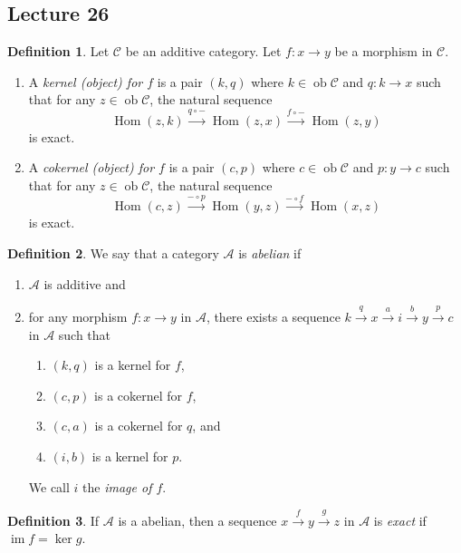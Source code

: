 \documentclass[10pt,letterpaper,cm]{nupset}
\theoremstyle{definition}
\newtheorem{definition}{Definition}[subsection]
\theoremstyle{theorem}
\theoremstyle{remark}
\newcommand{\1}{\mathbf{1}}
\renewcommand{\a}{\mathscr{A}}
\renewcommand{\c}{\mathscr{C}}
\newcommand{\0}{\vec 0}
\DeclareMathOperator{\im}{im}
\DeclareMathOperator{\ob}{ob}
\DeclareMathOperator{\Hom}{Hom}
\begin{document}
\subsection{Lecture 26}

\begin{definition}
Let $\c$ be an additive category. Let $f: x \to y$ be a morphism in $\c$. 
\begin{enumerate}
\item A \textit{kernel (object) for $f$} is a pair $\left(k, q\right)$ where $k \in \ob{\c}$ and $q : k \to x$ such that for any $z \in \ob{\c}$, the natural sequence $$ \Hom(z,k) \overset{q\circ {-}}{\longrightarrow} \Hom(z,x) \overset{f\circ {-}}{\longrightarrow} \Hom(z,y)   $$ is exact.
\item  A \textit{cokernel (object) for $f$} is a pair $\left(c, p\right)$ where $c \in \ob{\c}$ and $p : y \to c$ such that for any $z \in \ob{\c}$, the natural sequence $$ \Hom(c,z) \overset{{-}\circ p}{\longrightarrow} \Hom(y,z) \overset{{-}\circ f}{\longrightarrow} \Hom(x,z)   $$ is exact.
\end{enumerate}
\end{definition}

\begin{definition}
We say that a category $\a$ is \textit{abelian} if
\begin{enumerate}
\item $\a$ is additive and
\item for any morphism $f : x \to y$ in $\a$, there exists a sequence $k \overset{q}{\longrightarrow} x  \overset{a}{\longrightarrow} i \overset{b}{\longrightarrow}y \overset{p}{\longrightarrow} c$ in $\a$ such that
\begin{enumerate}
\item $\left(k, q\right)$ is a kernel for $f$,
\item $\left(c, p\right)$ is a cokernel for $f$,
\item $\left(c, a\right)$ is a cokernel for $q$, and
\item $\left(i,b\right)$ is a kernel for $p$.
\end{enumerate}
We call $i$ the \textit{image of $f$}.
\end{enumerate}
\end{definition}

\begin{definition}
If $\a$ is a abelian, then a sequence $x \overset{f}{\longrightarrow} y \overset{g}{\longrightarrow} z$ in $\a$ is \textit{exact} if $\im{f} = \ker{g}$.
\end{definition}
\end{document}
